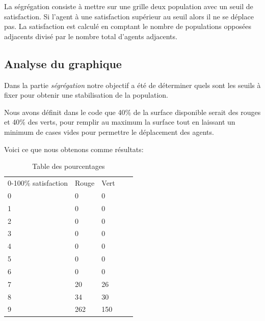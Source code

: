 \documentclass[a4paper,12pt]{report}
\begin{document}
La ségrégation consiste à mettre sur une grille deux population avec un seuil de satisfaction. Si l'agent à une satisfaction supérieur au seuil alors il ne se déplace pas. La satisfaction est calculé en comptant le nombre de populations opposées adjacents divisé par le nombre total d'agents adjacents.

\subsection*{Analyse du graphique}

Dans la partie \textit{ségrégation} notre objectif a été de déterminer quels sont les seuils à fixer pour obtenir une stabilisation de la population.

Nous avons définit dans le code que 40\% de la surface disponible serait des rouges et 40\% des verts, pour remplir au maximum la surface tout en laissant un minimum de cases vides pour permettre le déplacement des agents.

Voici ce que nous obtenons comme résultats:
\begin{center}
\begin{table}[h]
\begin{center}
\begin{tabular}{|l|l|l|ll}
\cline{1-3}
0-100\% satisfaction & Rouge & Vert &  &  \\ \cline{1-3}
0 & 0 & 0 &  &  \\ \cline{1-3}
1 & 0 & 0 &  &  \\ \cline{1-3}
2 & 0 & 0 &  &  \\ \cline{1-3}
3 & 0 & 0 &  &  \\ \cline{1-3}
4 & 0 & 0 &  &  \\ \cline{1-3}
5 & 0 & 0 &  &  \\ \cline{1-3}
6 & 0 & 0 &  &  \\ \cline{1-3}
7 & 20 & 26 &  &  \\ \cline{1-3}
8 & 34 & 30 &  &  \\ \cline{1-3}
9 & 262 & 150 &  &  \\ \cline{1-3}
\end{tabular}
\end{center}
\caption{Table des pourcentages}
\label{my-label}
\end{table}
\end{center}
\end{document}
